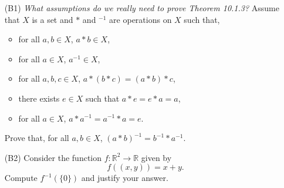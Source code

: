 \documentclass{article}
\begin{document}
\begin{itemize}
	\item [(B1)] \emph{What assumptions do we really need to prove Theorem 10.1.3?}  Assume that $X$ is a set and $*$ and ${}^{-1}$ are operations on $X$ such that,
		\begin{itemize}
			\item for all $a, b \in X$, $a * b \in X$,
			\item for all $a \in X$, $a^{-1} \in X$,
			\item for all $a, b, c \in X$, $a * (b * c) = (a * b) * c$,
			\item there exists $e \in X$ such that $a * e = e * a = a$,
			\item for all $a \in X$, $a * a^{-1} = a^{-1} * a = e$.
		\end{itemize}
		Prove that, for all $a, b \in X$, $(a * b)^{-1} = b^{-1} * a^{-1}$.
	\item [(B2)] Consider the function $f : \mathbb{R}^2 \rightarrow \mathbb{R}$ given by
		\[
			f((x,y)) = x + y.
		\]
		Compute $f^{-1}( \{ 0 \} )$ and justify your answer.
\end{itemize}
\end{document}
